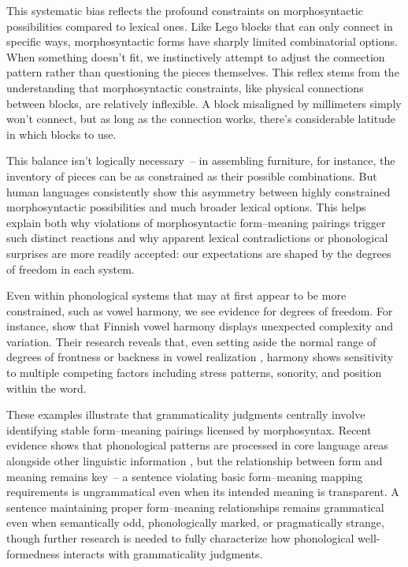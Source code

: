 \documentclass[12pt,letterpaper]{article}
\begin{document}
This systematic bias reflects the profound constraints on morphosyntactic possibilities compared to lexical ones. Like Lego blocks that can only connect in specific ways, morphosyntactic forms have sharply limited combinatorial options. When something doesn't fit, we instinctively attempt to adjust the connection pattern rather than questioning the pieces themselves. This reflex stems from the understanding that morphosyntactic constraints, like physical connections between blocks, are relatively inflexible. A block misaligned by millimeters simply won't connect, but as long as the connection works, there's considerable latitude in which blocks to use.

This balance isn't logically necessary~-- in assembling furniture, for instance, the inventory of pieces can be as constrained as their possible combinations. But human languages consistently show this asymmetry between highly constrained morphosyntactic possibilities and much broader lexical options. This helps explain both why violations of morphosyntactic form--meaning pairings trigger such distinct reactions and why apparent lexical contradictions or phonological surprises are more readily accepted: our expectations are shaped by the degrees of freedom in each system.

Even within phonological systems that may at first appear to be more constrained, such as vowel harmony, we see evidence for degrees of freedom. For instance, \textcite{Ringen1999} show that Finnish vowel harmony displays unexpected complexity and variation. Their research reveals that, even setting aside the normal range of degrees of frontness or backness in vowel realization \autocite{Duncan2008, Lennes2003}, harmony shows sensitivity to multiple competing factors including stress patterns, sonority, and position within the word.

\bigskip
These examples illustrate that grammaticality judgments centrally involve identifying stable form--meaning pairings licensed by morphosyntax. Recent evidence shows that phonological patterns are processed in core language areas alongside other linguistic information \autocite{Regev2024}, but the relationship between form and meaning remains key~-- a sentence violating basic form--meaning mapping requirements is ungrammatical even when its intended meaning is transparent. A sentence maintaining proper form--meaning relationships remains grammatical even when semantically odd, phonologically marked, or pragmatically strange, though further research is needed to fully characterize how phonological well-formedness interacts with grammaticality judgments. 
\end{document}
